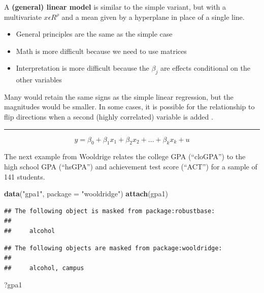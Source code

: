 \documentclass[]{book}
\newenvironment{Shaded}{\begin{snugshade}}{\end{snugshade}}
\newcommand{\DataTypeTok}[1]{\textcolor[rgb]{0.13,0.29,0.53}{#1}}
\newcommand{\KeywordTok}[1]{\textcolor[rgb]{0.13,0.29,0.53}{\textbf{#1}}}
\newcommand{\NormalTok}[1]{#1}
\newcommand{\StringTok}[1]{\textcolor[rgb]{0.31,0.60,0.02}{#1}}
\providecommand{\tightlist}{%
  \setlength{\itemsep}{0pt}\setlength{\parskip}{0pt}}
\begin{document}
A \textbf{(general) linear model} is similar to the simple variant, but
with a multivariate \(x \epsilon \!R^{\rho}\) and a mean given by a
hyperplane in place of a single line.

\begin{itemize}
\tightlist
\item
  General principles are the same as the simple case
\item
  Math is more difficult because we need to use matrices
\item
  Interpretation is more difficult because the \(\beta_{j}\) are effects
  conditional on the other variables
\end{itemize}

Many would retain the same signs as the simple linear regression, but
the magnitudes would be smaller. In some cases, it is possible for the
relationship to flip directions when a second (highly correlated)
variable is added \citet{dalpiaz2016}.

\begin{center}\rule{0.5\linewidth}{\linethickness}\end{center}

\begin{equation}
y = \beta_{0} + \beta_{1}x_{1} +  \beta_{2}x_{2} + \dots + \beta_{k}x_{k} + u   
\label{eq:multipleregression}
\end{equation}

The next example from Wooldrige relates the college GPA (``cloGPA'') to
the high school GPA (``hsGPA'') and achievement test score (``ACT'') for
a sample of 141 students.

\begin{Shaded}
\begin{Highlighting}[]
\KeywordTok{data}\NormalTok{(}\StringTok{"gpa1"}\NormalTok{, }\DataTypeTok{package =} \StringTok{"wooldridge"}\NormalTok{)}
\KeywordTok{attach}\NormalTok{(gpa1)}
\end{Highlighting}
\end{Shaded}

\begin{verbatim}
## The following object is masked from package:robustbase:
## 
##     alcohol
\end{verbatim}

\begin{verbatim}
## The following objects are masked from package:wooldridge:
## 
##     alcohol, campus
\end{verbatim}

\begin{Shaded}
\begin{Highlighting}[]
\NormalTok{?gpa1}
\end{Highlighting}
\end{Shaded}
\end{document}
